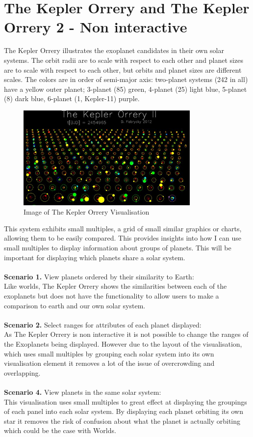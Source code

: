 \section{The Kepler Orrery and The Kepler Orrery 2 - Non interactive}
The Kepler Orrery \cite{orrery} illustrates the exoplanet candidates in their
own solar systems. The orbit radii are to scale with respect to each other and
planet sizes are to scale with respect to each other, but orbits and planet
sizes are different scales. The colors are in order of semi-major axis:
two-planet systems (242 in all) have a yellow outer planet; 3-planet (85) green,
4-planet (25) light blue, 5-planet (8) dark blue, 6-planet (1, Kepler-11)
purple. 
\begin{figure}[H]
  \centering
      \includegraphics[width=0.8\textwidth]{images/orrery.jpg}
  \caption{Image of The Kepler Orrery Visualisation}
\end{figure}
This system exhibits small multiples, a grid of small similar graphics or
charts, allowing them to be easily compared. This provides insights into how I
can use small multiples to display information about groups of planets. This
will be important for displaying which planets share a solar system.
\\\\
{\bf Scenario 1.} View planets ordered by their similarity to Earth:\\
Like worlds, The Kepler Orrery shows the similarities between each of the
exoplanets but does not have the functionality to allow users to make a
comparison to earth and our own solar system.
\\\\
{\bf Scenario 2.} Select ranges for attributes of each planet displayed:\\
As The Kepler Orrery is non interactive it is not possible to change the ranges
of the Exoplanets being displayed. However due to the layout of the
visualisation, which uses small multiples by grouping each solar system into its
own visualisation element it removes a lot of the issue of overcrowding and
overlapping.
\\\\
{\bf Scenario 4.} View planets in the same solar system:\\
This visualisation uses small multiples to great effect at displaying the
groupings of each panel into each solar system. By displaying each planet
orbiting its own star it removes the risk of confusion about what the planet is
actually orbiting which could be the case with Worlds.

